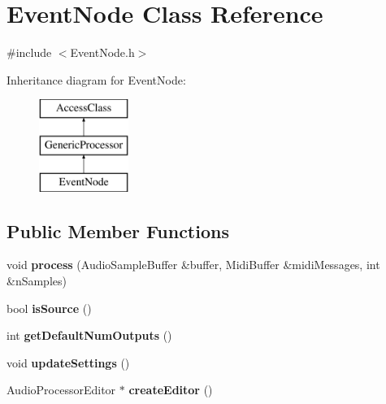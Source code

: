 \hypertarget{classEventNode}{\section{Event\-Node Class Reference}
\label{classEventNode}
}


{\ttfamily \#include $<$Event\-Node.\-h$>$}

Inheritance diagram for Event\-Node\-:\begin{figure}[H]
\begin{center}
\leavevmode
\includegraphics[height=3.000000cm]{classEventNode}
\end{center}
\end{figure}
\subsection*{Public Member Functions}
\begin{DoxyCompactItemize}
\item 
\hypertarget{classEventNode_a28028d513a537386d87dbc925f53261b}{void {\bfseries process} (Audio\-Sample\-Buffer \&buffer, Midi\-Buffer \&midi\-Messages, int \&n\-Samples)}\label{classEventNode_a28028d513a537386d87dbc925f53261b}

\item 
\hypertarget{classEventNode_aae0383ac176ded4cd6788ffb7e8d3aca}{bool {\bfseries is\-Source} ()}\label{classEventNode_aae0383ac176ded4cd6788ffb7e8d3aca}

\item 
\hypertarget{classEventNode_a09c5bc4617e5457bfdfbd4c1811e31f8}{int {\bfseries get\-Default\-Num\-Outputs} ()}\label{classEventNode_a09c5bc4617e5457bfdfbd4c1811e31f8}

\item 
\hypertarget{classEventNode_ad219724f2a2334735574df18a9a47691}{void {\bfseries update\-Settings} ()}\label{classEventNode_ad219724f2a2334735574df18a9a47691}

\item 
\hypertarget{classEventNode_ab66d8a254503f0bbc144ce1072aaf4ac}{Audio\-Processor\-Editor $\ast$ {\bfseries create\-Editor} ()}\label{classEventNode_ab66d8a254503f0bbc144ce1072aaf4ac}

\end{DoxyCompactItemize}
